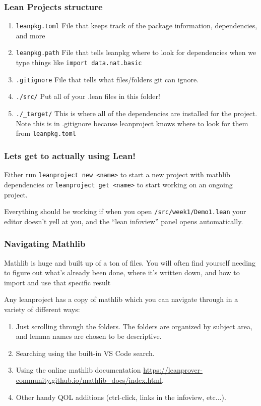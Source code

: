 \documentclass{beamer}
\begin{document}
\begin{frame}[fragile]
    \frametitle{Lean Projects structure}
    \begin{enumerate}
        \item \verb!leanpkg.toml! File that keeps track of the package information, dependencies, and more
        \item \verb!leanpkg.path! File that tells leanpkg where to look for dependencies when we type things like \verb!import data.nat.basic!
        \item \verb!.gitignore! File that tells what files/folders git can ignore. 
        \item \verb!./src/! Put all of your .lean files in this folder!
        \item \verb!./_target/! This is where all of the dependencies are installed for the project. Note this is in .gitignore because leanproject knows where to look for them from \verb!leanpkg.toml!
    \end{enumerate}
\end{frame}

\begin{frame}[fragile]
    \frametitle{Lets get to actually using Lean!}

    Either run \verb!leanproject new <name>! to start a new project with mathlib dependencies or \verb!leanproject get <name>! to start working on an ongoing project. 
    \vspace{10pt}

    Everything should be working if when you open \verb!/src/week1/Demo1.lean! your editor doesn't yell at you, and the ``lean infoview'' panel opens automatically. 
\end{frame}

\begin{frame}
    \frametitle{Navigating Mathlib}

    Mathlib is huge and built up of a ton of files. You will often find yourself needing to figure out what's already been done, where it's written down, and how to import and use that specific result
    \vspace{10pt}
    \pause 

    Any leanproject has a copy of mathlib which you can navigate through in a variety of different ways:
    \begin{enumerate}
        \item Just scrolling through the folders. The folders are organized by subject area, and lemma names are chosen to be descriptive. 
        \item Searching using the built-in VS Code search. 
        \item Using the online mathlib documentation \url{https://leanprover-community.github.io/mathlib_docs/index.html}. 
        \item Other handy QOL additions (ctrl-click, links in the infoview, etc...). 
    \end{enumerate}

\end{frame}
\end{document}
